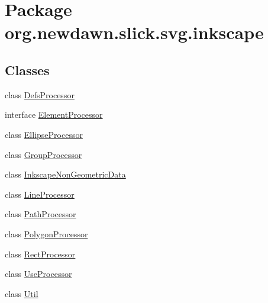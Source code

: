 \hypertarget{namespaceorg_1_1newdawn_1_1slick_1_1svg_1_1inkscape}{}\section{Package org.\+newdawn.\+slick.\+svg.\+inkscape}
\label{namespaceorg_1_1newdawn_1_1slick_1_1svg_1_1inkscape}
\subsection*{Classes}
\begin{DoxyCompactItemize}
\item 
class \mbox{\hyperlink{classorg_1_1newdawn_1_1slick_1_1svg_1_1inkscape_1_1_defs_processor}{Defs\+Processor}}
\item 
interface \mbox{\hyperlink{interfaceorg_1_1newdawn_1_1slick_1_1svg_1_1inkscape_1_1_element_processor}{Element\+Processor}}
\item 
class \mbox{\hyperlink{classorg_1_1newdawn_1_1slick_1_1svg_1_1inkscape_1_1_ellipse_processor}{Ellipse\+Processor}}
\item 
class \mbox{\hyperlink{classorg_1_1newdawn_1_1slick_1_1svg_1_1inkscape_1_1_group_processor}{Group\+Processor}}
\item 
class \mbox{\hyperlink{classorg_1_1newdawn_1_1slick_1_1svg_1_1inkscape_1_1_inkscape_non_geometric_data}{Inkscape\+Non\+Geometric\+Data}}
\item 
class \mbox{\hyperlink{classorg_1_1newdawn_1_1slick_1_1svg_1_1inkscape_1_1_line_processor}{Line\+Processor}}
\item 
class \mbox{\hyperlink{classorg_1_1newdawn_1_1slick_1_1svg_1_1inkscape_1_1_path_processor}{Path\+Processor}}
\item 
class \mbox{\hyperlink{classorg_1_1newdawn_1_1slick_1_1svg_1_1inkscape_1_1_polygon_processor}{Polygon\+Processor}}
\item 
class \mbox{\hyperlink{classorg_1_1newdawn_1_1slick_1_1svg_1_1inkscape_1_1_rect_processor}{Rect\+Processor}}
\item 
class \mbox{\hyperlink{classorg_1_1newdawn_1_1slick_1_1svg_1_1inkscape_1_1_use_processor}{Use\+Processor}}
\item 
class \mbox{\hyperlink{classorg_1_1newdawn_1_1slick_1_1svg_1_1inkscape_1_1_util}{Util}}
\end{DoxyCompactItemize}
